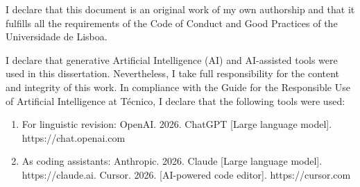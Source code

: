 \documentclass[defaultstyle,10pt,Helvetica]{istulthesis}
\begin{document}



I declare that this document is an original work of my own authorship and that it fulfills all the requirements of the Code of Conduct and Good Practices of the Universidade de Lisboa.

I declare that generative Artificial Intelligence (AI) and AI-assisted tools were used in this dissertation. Nevertheless, I take full responsibility for the content and integrity of this work. In compliance with the Guide for the Responsible Use of Artificial Intelligence at Técnico, I declare that the following tools were used:
\begin{enumerate}
	\item For linguistic revision: OpenAI. 2026. ChatGPT [Large language model]. https://chat.openai.com
	\item As coding assistants: Anthropic. 2026. Claude [Large language model]. https://claude.ai. Cursor. 2026. [AI-powered code editor]. https://cursor.com
\end{enumerate}



\clearpage
\end{document}
